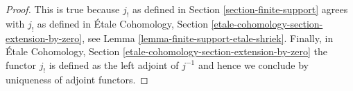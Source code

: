 \documentclass{stacks-project}
\theoremstyle{plain}
\theoremstyle{definition}
\theoremstyle{remark}
\numberwithin{equation}{subsection}
\begin{document}
\begin{proof}
This is true because $j_!$ as defined in
Section \ref{section-finite-support}
agrees with $j_!$ as defined in \'Etale Cohomology, Section
\ref{etale-cohomology-section-extension-by-zero}, see
Lemma \ref{lemma-finite-support-etale-shriek}. Finally, in
\'Etale Cohomology, Section \ref{etale-cohomology-section-extension-by-zero}
the functor $j_!$ is defined
as the left adjoint of $j^{-1}$ and hence we conclude by
uniqueness of adjoint functors.
\end{proof}
\end{document}
